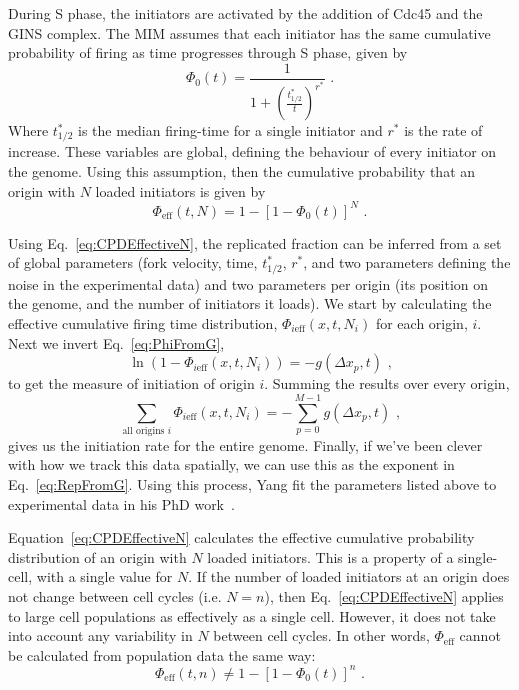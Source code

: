 {		During S phase, the initiators are activated by the addition of Cdc45 and the GINS complex.
		The MIM assumes that each initiator has the same cumulative probability of firing as time progresses through S phase, given by
		\begin{equation}\label{eq:CPDInitiator}
			\Phi_0(t) = \frac{1}{1+\left(\frac{t^*_{1/2}}{t}\right)^{r^*}}\text{ .}
		\end{equation}
		Where $t^*_{1/2}$ is the median firing-time for a single initiator and $r^*$ is the rate of increase.
		These variables are global, defining the behaviour of every initiator on the genome.
		Using this assumption, then the cumulative probability that an origin with $N$ loaded initiators is given by
		\begin{equation} \label{eq:CPDEffectiveN}
			\Phi_{\text{eff}}(t,N) = 1 - \left[1 - \Phi_0(t)\right]^N\text{ .}
		\end{equation}
		
		Using Eq.~\ref{eq:CPDEffectiveN}, the replicated fraction can be inferred from a set of global parameters (fork velocity, time, $t^*_{1/2}$, $r^*$, and two parameters defining the noise in the experimental data) and two parameters per origin (its position on the genome, and the number of initiators it loads).
		We start by calculating the effective cumulative firing time distribution, $\Phi_{i\text{eff}}(x,t,N_i)$ for each origin, $i$.
		Next we invert Eq.~\ref{eq:PhiFromG},
		\begin{equation}
			\ln \left( 1- \Phi_{i\text{eff}}(x,t,N_i)\right) = - g(\Delta x_p, t) \text{ ,}
		\end{equation}
		to get the measure of initiation of origin $i$.
		Summing the results over every origin,
		\begin{equation}
			\sum\limits_{\text{all origins }i}\Phi_{i\text{eff}}(x,t,N_i) = - \sum\limits_{p=0}^{M-1} g(\Delta x_p,t) \text{ ,}
		\end{equation}
		gives us the initiation rate for the entire genome.
		Finally, if we've been clever with how we track this data spatially, we can use this as the exponent in Eq.~\ref{eq:RepFromG}.
		Using this process, Yang fit the parameters listed above to experimental data in his PhD work~\cite{ScottsThesis}.
	
		Equation~\ref{eq:CPDEffectiveN} calculates the effective cumulative probability distribution of an origin with $N$ loaded initiators.
		This is a property of a single-cell, with a single value for $N$.
		If the number of loaded initiators at an origin does not change between cell cycles (i.e. $N=n$), then Eq.~\ref{eq:CPDEffectiveN} applies to large cell populations as effectively as a single cell.
		However, it does not take into account any variability in $N$ between cell cycles.
		In other words, $\Phi_{\text{eff}}$ cannot be calculated from population data the same way:
		\begin{equation} \label{eq:CPDEffectivenTemp}
			\Phi_{\text{eff}}(t,n) \neq 1 - \left[1 - \Phi_0(t)\right]^n\text{ .}
		\end{equation}
		
}
